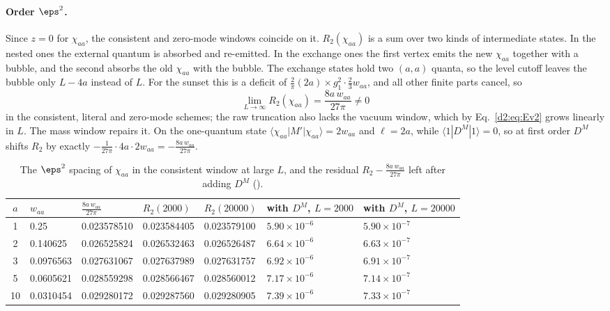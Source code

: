 \paragraph{Order $\eps^2$.}\label{d2:app:desc2} Since $z=0$ for $\chi_{aa}$, the consistent and zero-mode windows coincide on
it. $R_2(\chi_{aa})$ is a sum over two kinds of intermediate states. In the nested ones the external quantum is absorbed and
re-emitted. In the exchange ones the first vertex emits the new $\chi_{aa}$ together with a bubble, and the second absorbs
the old $\chi_{aa}$ with the bubble. The exchange states hold two $(a,a)$ quanta, so the level cutoff leaves the bubble only
$L-4a$ instead of $L$. For the sunset this is a deficit of $\frac2\pi(2a)\times g_1^2\cdot\frac23w_{aa}$, and all other finite
parts cancel, so
\begin{equation}
 \lim_{L\to\infty}R_2(\chi_{aa})=\frac{8a\,w_{aa}}{27\pi}\neq0
\end{equation}
in the consistent, literal and zero-mode schemes; the raw truncation also lacks the vacuum window, which by
Eq.~\eqref{d2:eq:Ev2} grows linearly in $L$. The mass window repairs it. On the one-quantum state
$\langle\chi_{aa}|M'|\chi_{aa}\rangle=2w_{aa}$ and $\ell=2a$, while $\langle1|D^M|1\rangle=0$, so at first order $D^M$ shifts $R_2$ by
exactly $-\frac1{27\pi}\cdot4a\cdot2w_{aa}=-\frac{8a\,w_{aa}}{27\pi}$.

\begin{table}[ht]
\centering\footnotesize\renewcommand{\arraystretch}{1.15}
\begin{tabular}{@{}cllllll@{}}
\toprule
$a$ & $w_{aa}$ & $\frac{8a\,w_{aa}}{27\pi}$ & $R_2(2000)$ & $R_2(20000)$ & with $D^M$, $L=2000$ & with $D^M$, $L=20000$ \\\midrule
1 & 0.25 & 0.023578510 & 0.023584405 & 0.023579100 & $5.90\times10^{-6}$ & $5.90\times10^{-7}$ \\
2 & 0.140625 & 0.026525824 & 0.026532463 & 0.026526487 & $6.64\times10^{-6}$ & $6.63\times10^{-7}$ \\
3 & 0.0976563 & 0.027631067 & 0.027637989 & 0.027631757 & $6.92\times10^{-6}$ & $6.91\times10^{-7}$ \\
5 & 0.0605621 & 0.028559298 & 0.028566467 & 0.028560012 & $7.17\times10^{-6}$ & $7.14\times10^{-7}$ \\
10 & 0.0310454 & 0.029280172 & 0.029287560 & 0.029280905 & $7.39\times10^{-6}$ & $7.33\times10^{-7}$ \\
\bottomrule
\end{tabular}
\caption{The $\eps^2$ spacing of $\chi_{aa}$ in the consistent window at large $L$, and the residual
$R_2-\frac{8a\,w_{aa}}{27\pi}$ left after adding $D^M$ ().}
\label{d2:tab:desc2}
\end{table}


